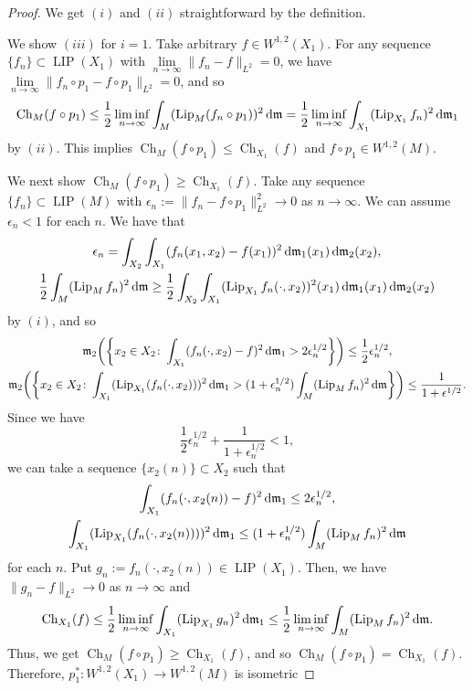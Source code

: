 \documentclass[10pt,a4paper]{amsart}
\numberwithin{equation}{section}
\theoremstyle{definition}
\newcommand{\LIP}{\operatorname{LIP}}
\newcommand{\Lip}{\operatorname{Lip}}
\newcommand{\Ch}{\operatorname{Ch}}
\newcommand{\mf}{\mathfrak{m}}
\begin{document}
\begin{proof}
We get $(i)$ and $(ii)$ straightforward by the definition.

We show $(iii)$ for $i=1$.
Take arbitrary $f\in W^{1,2}(X_1)$.
For any sequence $\{f_n\}\subset \LIP(X_1)$ with $\lim\limits_{n\to \infty}\|f_n-f\|_{L^2}=0$, we have
$\lim\limits_{n\to \infty}\|f_n\circ p_1-f\circ p_1\|_{L^2}=0$, and so
\[
\Ch_M(f\circ p_1)\leq\frac{1}{2} \liminf_{n\to \infty}\int_M (\Lip_M(f_n\circ p_1))^2\,{\rm d}\mf=\frac{1}{2}\liminf_{n\to \infty}\int_{X_1}(\Lip_{X_1} f_n)^2\,{\rm d}\mf_1
\]
by $(ii)$. This implies $\Ch_M(f\circ p_1)\leq \Ch_{X_1}(f)$ and $f\circ p_1\in W^{1,2}(M)$.

We next show $\Ch_M(f\circ p_1)\geq \Ch_{X_1}(f)$.
Take any sequence $\{f_n\}\subset\LIP(M)$ with $\epsilon_n:=\|f_n-f\circ p_1\|_{L^2}^2\to 0$ as $n\to\infty$.
We can assume $\epsilon_n<1$ for each $n$.
We have that
\begin{gather*}
\epsilon_n=\int_{X_2} \int_{X_1} (f_n(x_1,x_2)-f(x_1))^2\,{\rm d}\mf_1(x_1)\,{\rm d}\mf_2(x_2),
\\
\frac{1}{2} \int_M (\Lip_M f_n)^2\,{\rm d}\mf\geq \frac{1}{2}\int_{X_2} \int_{X_1} (\Lip_{X_1} f_n(\cdot,x_2))^2(x_1)\,{\rm d}\mf_1(x_1)\,{\rm d}\mf_2(x_2)
\end{gather*}
by $(i)$,
and so
\begin{gather*}
\mf_2\bigg(\bigg\{x_2\in X_2\colon \int_{X_1}(f_n(\cdot,x_2)-f)^2\,{\rm d}\mf_1> 2\epsilon_n^{1/2}\bigg\}\bigg)\leq \frac{1}{2}\epsilon_n^{1/2},
\\
\mf_2\bigg(\bigg\{x_2\in X_2\colon \int_{X_1}(\Lip_{X_1}(f_n(\cdot,x_2)))^2\,{\rm d}\mf_1> (1+\epsilon_n^{1/2})\int_M(\Lip_M f_n)^2\,{\rm d}\mf\bigg\}\bigg)\leq \frac{1}{1+\epsilon^{1/2}}.
\end{gather*}
Since we have
\[
\frac{1}{2}\epsilon_n^{1/2}+\frac{1}{1+\epsilon_n^{1/2}}<1,
\]
we can take a sequence $\{x_2(n)\}\subset X_2$ such that
\begin{gather*}
\int_{X_1}(f_n(\cdot,x_2(n))-f)^2\,{\rm d}\mf_1\leq 2\epsilon_n^{1/2},
\\
\int_{X_1}(\Lip_{X_1}(f_n(\cdot,x_2(n))))^2\,{\rm d}\mf_1
\leq  (1+\epsilon_n^{1/2})\int_M(\Lip_M f_n)^2\,{\rm d}\mf
\end{gather*}
for each $n$.
Put $g_n:=f_n(\cdot, x_2(n))\in\LIP(X_1)$.
Then, we have $\|g_n-f\|_{L^2}\to 0$ as $n\to\infty$ and
\[
\Ch_{X_1}(f)\leq \frac{1}{2}\liminf_{n\to \infty}\int_{X_1}(\Lip_{X_1}g_n)^2\,{\rm d}\mf_1\leq \frac{1}{2}\liminf_{n\to \infty}\int_M(\Lip_M f_n)^2\,{\rm d}\mf.
\]
Thus, we get $\Ch_M(f\circ p_1)\!\geq\! \Ch_{X_1}(f)$, and so $\Ch_M(f\circ p_1)\!=\! \Ch_{X_1}(f)$.
Therefore, $p_1^\ast\colon W^{1,2}(X_1)\!\to W^{1,2}(M)$ is isometric


\end{proof}
\end{document}
